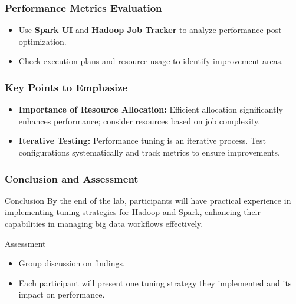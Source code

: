 \documentclass[aspectratio=169]{beamer}
\begin{document}
\begin{frame}[fragile]
    \frametitle{Performance Metrics Evaluation}
    \begin{itemize}
        \item Use \textbf{Spark UI} and \textbf{Hadoop Job Tracker} to analyze performance post-optimization.
        \item Check execution plans and resource usage to identify improvement areas.
    \end{itemize}
\end{frame}

\begin{frame}[fragile]
    \frametitle{Key Points to Emphasize}
    \begin{itemize}
        \item \textbf{Importance of Resource Allocation:} Efficient allocation significantly enhances performance; consider resources based on job complexity.
        \item \textbf{Iterative Testing:} Performance tuning is an iterative process. Test configurations systematically and track metrics to ensure improvements.
    \end{itemize}
\end{frame}

\begin{frame}[fragile]
    \frametitle{Conclusion and Assessment}
    \begin{block}{Conclusion}
        By the end of the lab, participants will have practical experience in implementing tuning strategies for Hadoop and Spark, enhancing their capabilities in managing big data workflows effectively.
    \end{block}
    
    \begin{block}{Assessment}
        \begin{itemize}
            \item Group discussion on findings.
            \item Each participant will present one tuning strategy they implemented and its impact on performance.
        \end{itemize}
    \end{block}
\end{frame}
\end{document}
